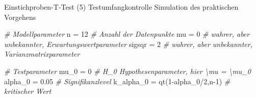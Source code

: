 \documentclass[
  8pt,
  ignorenonframetext,
]{beamer}
\newenvironment{Shaded}{\begin{snugshade}}{\end{snugshade}}
\newcommand{\CommentTok}[1]{\textcolor[rgb]{0.56,0.35,0.01}{\textit{#1}}}
\newcommand{\DecValTok}[1]{\textcolor[rgb]{0.00,0.00,0.81}{#1}}
\newcommand{\FloatTok}[1]{\textcolor[rgb]{0.00,0.00,0.81}{#1}}
\newcommand{\FunctionTok}[1]{\textcolor[rgb]{0.00,0.00,0.00}{#1}}
\newcommand{\NormalTok}[1]{#1}
\newcommand{\OtherTok}[1]{\textcolor[rgb]{0.56,0.35,0.01}{#1}}
\newcommand{\SpecialCharTok}[1]{\textcolor[rgb]{0.00,0.00,0.00}{#1}}
\begin{document}
\begin{frame}[fragile]{Einstichproben-T-Test \textbar{} (5)
Testumfangkontrolle}
\protect\hypertarget{einstichproben-t-test-5-testumfangkontrolle-4}{}
Simulation des praktischen Vorgehens \vspace{2mm}

\tiny
{}

\begin{Shaded}
\begin{Highlighting}[]
\CommentTok{\# Modellparameter}
\NormalTok{n         }\OtherTok{=} \DecValTok{12}                                           \CommentTok{\# Anzahl der Datenpunkte}
\NormalTok{mu        }\OtherTok{=} \DecValTok{0}                                            \CommentTok{\# wahrer, aber unbekannter, Erwartungswertparameter}
\NormalTok{sigsqr    }\OtherTok{=} \DecValTok{2}                                            \CommentTok{\# wahrer, aber unbekannter, Varianzmatrixparameter}

\CommentTok{\# Testparameter}
\NormalTok{mu\_0      }\OtherTok{=} \DecValTok{0}                                            \CommentTok{\# H\_0 Hypothesenparameter, hier \textbackslash{}mu = \textbackslash{}mu\_0}
\NormalTok{alpha\_0   }\OtherTok{=} \FloatTok{0.05}                                         \CommentTok{\# Signifikanzlevel}
\NormalTok{k\_alpha\_0 }\OtherTok{=} \FunctionTok{qt}\NormalTok{(}\DecValTok{1}\SpecialCharTok{{-}}\NormalTok{alpha\_0}\SpecialCharTok{/}\DecValTok{2}\NormalTok{,n}\DecValTok{{-}1}\NormalTok{)                          }\CommentTok{\# kritischer Wert}


\end{Highlighting}
\end{Shaded}
\end{frame}
\end{document}
